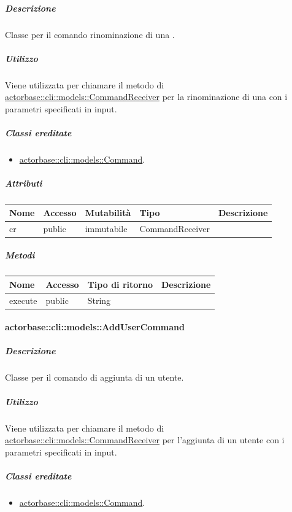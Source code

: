 \documentclass{scalatekids-article}
\begin{document}
\subparagraph{Descrizione}

Classe per il comando rinominazione di una .

\subparagraph{Utilizzo}

Viene utilizzata per chiamare il metodo di \hyperref[sec:actorbase::cli::models::CommandReceiver]{actorbase::cli::models::CommandReceiver} per la rinominazione di una  con i parametri specificati in input.

\subparagraph{Classi ereditate}

\begin{itemize}
\item \hyperref[sec:actorbase::cli::models::Command]{actorbase::cli::models::Command}.
\end{itemize}

\subparagraph{Attributi}

\begin{tabular}{| l | l | l | l | l |}
	\hline
	Nome & Accesso & Mutabilità & Tipo & Descrizione\\
	\hline
	cr & public & immutabile & CommandReceiver & \\
	\hline
\end{tabular}

\subparagraph{Metodi}

\begin{tabular}{| l | l | l | l |}
	\hline
	Nome & Accesso & Tipo di ritorno & Descrizione\\
	\hline
	execute & public & String & \\
	\hline
\end{tabular}

\paragraph{actorbase::cli::models::AddUserCommand}
\label{sec:actorbase::cli::models::AddUserCommand}

\subparagraph{Descrizione}

Classe per il comando di aggiunta di un utente.

\subparagraph{Utilizzo}

Viene utilizzata per chiamare il metodo di
\hyperref[sec:actorbase::cli::models::CommandReceiver]{actorbase::cli::models::CommandReceiver} per l'aggiunta di un utente con i
parametri specificati in input.

\subparagraph{Classi ereditate}

\begin{itemize}
\item \hyperref[sec:actorbase::cli::models::Command]{actorbase::cli::models::Command}.
\end{itemize}
\end{document}
